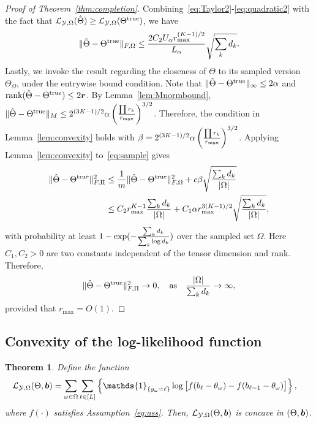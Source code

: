 \documentclass[11pt]{article}
\theoremstyle{plain}
\newtheorem{thm}{Theorem}[section]
\theoremstyle{definition}
\providecommand{\DIFaddbegin}{} %
\providecommand{\DIFaddend}{} %
\begin{document}
\begin{proof}[Proof of Theorem~\ref{thm:completion}]
Combining~\eqref{eq:Taylor2}-\eqref{eq:quadratic2} with the fact that $\mathcal{L}_{\mathcal{Y},\Omega}(\hat \Theta)\geq \mathcal{L}_{\mathcal{Y},\Omega}(\Theta^{\text{true}})$, we have
\begin{equation}\label{eq:sample}
\lVert\hat \Theta-\Theta^{\text{true}}\rVert_{F,\Omega}\leq {2C_2U_\alpha  r_{\max}^{(K-1)/2} \over L_\alpha} \sqrt{\sum_kd_k}.
\end{equation}
Lastly, we invoke the result regarding the closeness of $\Theta$ to its sampled version $\Theta_{\Omega}$, under the entrywise bound condition. Note that $\lVert\hat\Theta-\Theta^{\text{true}}\rVert_\infty\leq 2\alpha$ and $\text{rank}(\hat \Theta-\Theta^{\text{true}})\leq 2\bm{r}$. By Lemma~\ref{lem:Mnormbound}, $\lVert\hat \Theta-\Theta^{\text{true}}\rVert_M\leq 2^{(3K-1)/2} \alpha \left({\prod r_k \over r_{\max}}\right)^{3/2}$. Therefore, the condition in Lemma~\ref{lem:convexity} holds with $\beta=2^{(3K-1)/2}\alpha \left({\prod r_k \over r_{\max}}\right)^{3/2}$.
Applying Lemma~\ref{lem:convexity} to~\eqref{eq:sample} gives
\begin{align}
 \lVert\hat \Theta-\Theta^{\text{true}}\rVert_{F,\Pi}^2&\leq {1\over m}\lVert\hat \Theta-\Theta^{\text{true}}\rVert_{F,\Omega}^2+c\beta\sqrt{\sum_k d_k\over |\Omega|}\\
 &\leq {C_2  r^{K-1}_{\max}} {\sum_k d_k \over |\Omega|}+C_1 \alpha r_{\max}^{3(K-1)/2}\sqrt{\sum_kd_k\over |\Omega|},
\end{align}
with probability at least $1-\exp(-{\sum_kd_k\over \sum_k \log d_k})$ over the sampled set $\Omega$. Here $C_1, C_2>0$ are two constants independent of the tensor dimension and rank. Therefore,
\[
 \lVert\hat \Theta-\Theta^{\text{true}}\rVert_{F,\Pi}^2\to 0,\quad \text{as}\quad {|\Omega|\over \sum_kd_k}\to \infty,
\]
provided that $r_{\max}=O(1)$.
\end{proof}

\subsection{Convexity of the log-likelihood function}\DIFaddbegin \label{sec:proofconvexity}
\DIFaddend \begin{thm}\label{thm:convexity}
Define the function
\begin{align}\label{eq:function}
 \logl(\Theta, \mb)&=\sum_{\omega\in\Omega}\sum_{\ell\in[L]} \left\{\mathds{1}_{\{y_\omega=\ell\}} \log \big[f(b_\ell-\theta_\omega)-  f(b_{\ell-1}-\theta_\omega)\big]\right\},
 \end{align}
where $f(\cdot)$ satisfies Assumption~\eqref{eq:ass}. Then, $\mathcal{L}_{\mathcal{Y},\Omega}(\Theta, \bm{b})$ is concave in $(\Theta,\bm{b})$.
\end{thm}
\end{document}
